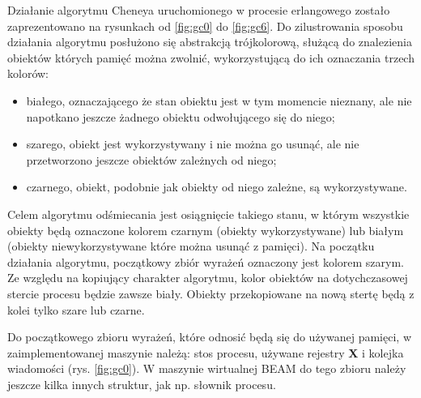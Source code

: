 Działanie algorytmu Cheneya uruchomionego w procesie erlangowego zostało zaprezentowano na rysunkach od \ref{fig:gc0} do \ref{fig:gc6}.
Do zilustrowania sposobu działania algorytmu posłużono się abstrakcją trójkolorową, służącą do znalezienia obiektów których pamięć można zwolnić, wykorzystującą do ich oznaczania trzech kolorów:
\begin{itemize}
\item białego, oznaczającego że stan obiektu jest w tym momencie nieznany, ale nie napotkano jeszcze żadnego obiektu odwołującego się do niego;
\item szarego, obiekt jest wykorzystywany i nie można go usunąć, ale nie przetworzono jeszcze obiektów zależnych od niego;
\item czarnego, obiekt, podobnie jak obiekty od niego zależne, są wykorzystywane.
\end{itemize}
Celem algorytmu odśmiecania jest osiągnięcie takiego stanu, w którym wszystkie obiekty będą oznaczone kolorem czarnym (obiekty wykorzystywane) lub białym (obiekty niewykorzystywane które można usunąć z pamięci).
Na początku działania algorytmu, początkowy zbiór wyrażeń oznaczony jest kolorem szarym.
Ze względu na kopiujący charakter algorytmu, kolor obiektów na dotychczasowej stercie procesu będzie zawsze biały.
Obiekty przekopiowane na nową stertę będą z kolei tylko szare lub czarne.

Do początkowego zbioru wyrażeń, które odnosić będą się do używanej pamięci, w zaimplementowanej maszynie należą:
stos procesu, używane rejestry \textbf{X} i kolejka wiadomości (rys. \ref{fig:gc0}). W maszynie wirtualnej BEAM do tego zbioru należy jeszcze kilka innych struktur, jak np. słownik procesu.

